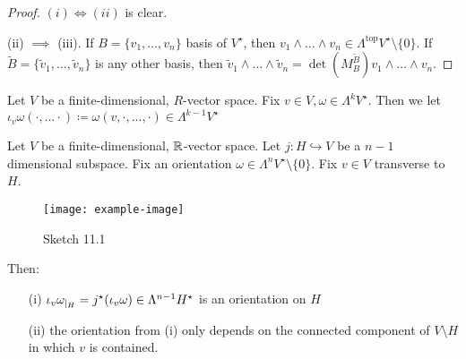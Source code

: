 \begin{proof}
    \((i)\iff(ii)\) is clear.

    (ii) \(\implies\) (iii). If \(B=\{v_1,\dots,v_n\}\) basis of \(V^\star\), then 
    \(v_1\wedge \dots\wedge v_n\in \Lambda^{\text{top}}V^\star\setminus\{0\}\). If \(\tilde{B}=\{\tilde{v}_1,\dots,\tilde{v}_n\}\)
    is any other basis, then \(\tilde{v}_1\wedge \dots\wedge \tilde{v}_n=\det(M_{B}^{\tilde{B}})v_1\wedge \dots\wedge v_n\).
\end{proof}

\begin{definition*}
    Let \(V\) be a finite-dimensional, \(R\)-vector space. Fix \(v\in V,\omega\in \Lambda^k V^\star\). Then we 
    let \(\iota_v\omega(\cdot,\dots\cdot)\coloneqq \omega(v,\cdot,\dots,\cdot)\in \Lambda^{k-1}V^\star\)
\end{definition*}

\begin{lemma}\label{lem:11.2}
    Let \(V\) be a finite-dimensional, \(\mathbb{R}\)-vector space. Let \(j:H\hookrightarrow V\) be a \(n-1\) dimensional 
    subspace. Fix an orientation \(\omega\in \Lambda^{n}V^\star\setminus\{0\}\). Fix \(v\in V\) transverse to \(H\).
    \begin{figure}[H]\label{fig:11.1}
        \centering
        \texttt{[image: example-image]}
        \caption{Sketch 11.1}
    \end{figure}  
    Then:
    \begin{enumerate}
        \item[(i)] \(\iota_v\omega_{|_{H}}=j^\star(\iota_v\omega)\in \Lambda^{n-1}H^\star\) is an orientation on \(H\)
        \item[(ii)] the orientation from (i) only depends on the connected component of \(V\setminus H\) in which \(v\) is contained. 
    \end{enumerate} 
\end{lemma}

